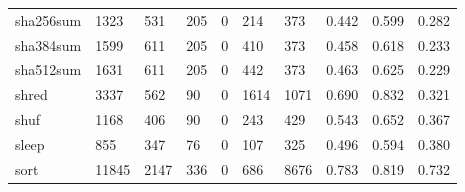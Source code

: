 \begin{longtable}{lp{2.0cm}p{2.0cm}p{2.0cm}p{2.0cm}p{2.0cm}p{2.0cm}p{2.0cm}p{2.0cm}p{2.0cm}}
sha256sum &                   1323 &                                531 &                               205 &                                0 &                               214 &                             373 &                                   0.442 &                                  0.599 &                                0.282 \\
sha384sum &                   1599 &                                611 &                               205 &                                0 &                               410 &                             373 &                                   0.458 &                                  0.618 &                                0.233 \\
sha512sum &                   1631 &                                611 &                               205 &                                0 &                               442 &                             373 &                                   0.463 &                                  0.625 &                                0.229 \\
shred     &                   3337 &                                562 &                                90 &                                0 &                              1614 &                            1071 &                                   0.690 &                                  0.832 &                                0.321 \\
shuf      &                   1168 &                                406 &                                90 &                                0 &                               243 &                             429 &                                   0.543 &                                  0.652 &                                0.367 \\
sleep     &                    855 &                                347 &                                76 &                                0 &                               107 &                             325 &                                   0.496 &                                  0.594 &                                0.380 \\
sort      &                  11845 &                               2147 &                               336 &                                0 &                               686 &                            8676 &                                   0.783 &                                  0.819 &                                0.732 \\

\end{longtable}

